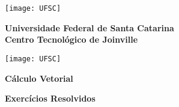 \documentclass[12pt]{article}
\begin{document}

\begin{tcolorbox}[colback=black!0]                                                               %
    \noindent\begin{minipage}{0.14\linewidth}
        \hspace*{-0.2cm}\texttt{[image: UFSC]}
    \end{minipage}
    \noindent\begin{minipage}{0.69\linewidth}
        \begin{center}
            \vspace*{0.2cm}
            {\bf \Large Universidade Federal de Santa Catarina} \\ \vspace{0.3cm}
            {\bf \Large Centro Tecnol{\'o}gico de Joinville} \\ \vspace{0.3cm}
        \end{center}
    \end{minipage}
    \noindent\begin{minipage}{0.14\linewidth}
        \hspace*{1.2cm}\texttt{[image: UFSC]}
    \end{minipage}
\end{tcolorbox}


\begin{tcolorbox}[colback=black!0]
    \begin{center}
        {\Large \bf Cálculo Vetorial}
    \end{center}
    \tcblower
    \begin{center}
        {\large \bf  Exercícios Resolvidos}
    \end{center}
\end{tcolorbox}
\end{document}
